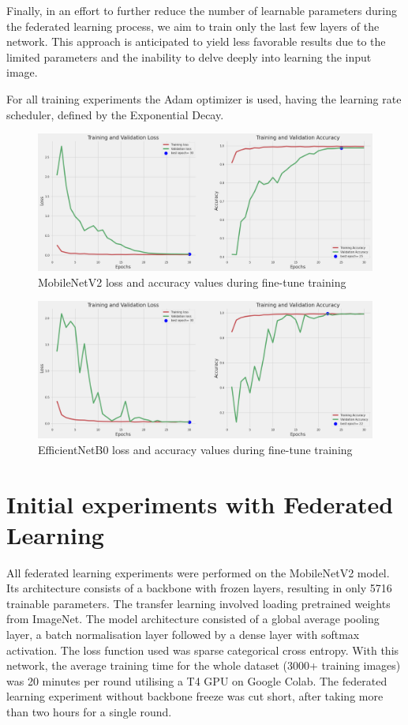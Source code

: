\documentclass[runningheads,a4paper,11pt]{report}
\begin{document}
Finally, in an effort to further reduce the number of learnable parameters during the federated learning process, we aim to train only the last few layers of the network. This approach is anticipated to yield less favorable results due to the limited parameters and the inability to delve deeply into learning the input image.

For all training experiments the Adam optimizer is used, having the learning rate scheduler, defined by the Exponential Decay. 

\begin{figure}[h]
    \centering
    \includegraphics[scale=0.25]{images/mobilenet.png} 
    \caption{MobileNetV2 loss and accuracy values during fine-tune training }
\end{figure}

\begin{figure}[h]
    \centering
    \includegraphics[scale=0.25]{images/efficientnet_plots.png} 
    \caption{EfficientNetB0 loss and accuracy values during fine-tune training }
\end{figure}


\section{Initial experiments with Federated Learning}
All federated learning experiments were performed on the MobileNetV2 model. Its architecture consists of a backbone with frozen layers, resulting in only 5716 trainable parameters. The transfer learning involved loading pretrained weights from ImageNet. The model architecture consisted of a global average pooling layer, a batch normalisation layer followed by a dense layer with softmax activation. The loss function used was sparse categorical cross entropy. With this network, the average training time for the whole dataset (3000+ training  images) was 20 minutes per round utilising a T4 GPU on Google Colab. The federated learning experiment without backbone freeze was cut short, after taking more than two hours for a single round.
\end{document}
